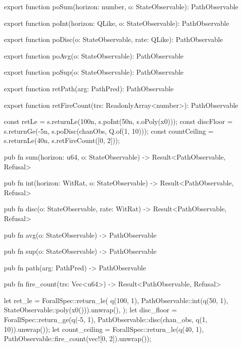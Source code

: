 \begin{tssrc}
export function poSum(horizon: number, o: StateObservable): PathObservable

export function poInt(horizon: QLike, o: StateObservable): PathObservable

export function poDisc(o: StateObservable, rate: QLike): PathObservable

export function poAvg(o: StateObservable): PathObservable

export function poSup(o: StateObservable): PathObservable

export function retPath(arg: PathPred): PathObservable

export function retFireCount(trs: ReadonlyArray<number>): PathObservable
\end{tssrc}
\begin{tssrc}
const retLe = s.returnLe(100n, s.poInt(50n, s.oPoly(x0)));
const discFloor = s.returnGe(-5n, s.poDisc(chanObs, Q.of(1, 10)));
const countCeiling = s.returnLe(40n, s.retFireCount([0, 2]));
\end{tssrc}
\begin{rustsrc}
pub fn sum(horizon: u64, o: StateObservable) -> Result<PathObservable, Refusal>

pub fn int(horizon: WitRat, o: StateObservable) -> Result<PathObservable, Refusal>

pub fn disc(o: StateObservable, rate: WitRat) -> Result<PathObservable, Refusal>

pub fn avg(o: StateObservable) -> PathObservable

pub fn sup(o: StateObservable) -> PathObservable

pub fn path(arg: PathPred) -> PathObservable

pub fn fire_count(trs: Vec<u64>) -> Result<PathObservable, Refusal>
\end{rustsrc}
\begin{rustsrc}
let ret_le = ForallSpec::return_le(
    q(100, 1),
    PathObservable::int(q(50, 1), StateObservable::poly(x0())).unwrap(),
);
let disc_floor =
    ForallSpec::return_ge(q(-5, 1), PathObservable::disc(chan_obs, q(1, 10)).unwrap());
let count_ceiling =
    ForallSpec::return_le(q(40, 1), PathObservable::fire_count(vec![0, 2]).unwrap());
\end{rustsrc}
